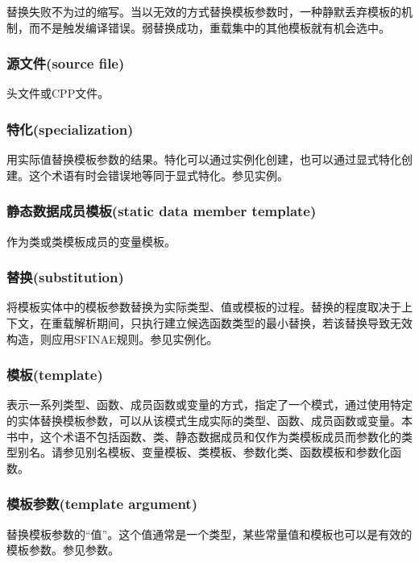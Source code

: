替换失败不为过的缩写。当以无效的方式替换模板参数时，一种静默丢弃模板的机制，而不是触发编译错误。弱替换成功，重载集中的其他模板就有机会选中。

\subsubsection{源文件(source file)}

头文件或CPP文件。

\subsubsection{特化(specialization)}

用实际值替换模板参数的结果。特化可以通过实例化创建，也可以通过显式特化创建。这个术语有时会错误地等同于显式特化。参见实例。

\subsubsection{静态数据成员模板(static data member template)}

作为类或类模板成员的变量模板。

\subsubsection{替换(substitution)}

将模板实体中的模板参数替换为实际类型、值或模板的过程。替换的程度取决于上下文，在重载解析期间，只执行建立候选函数类型的最小替换，若该替换导致无效构造，则应用SFINAE规则。参见实例化。

\subsubsection{模板(template)}

表示一系列类型、函数、成员函数或变量的方式，指定了一个模式，通过使用特定的实体替换模板参数，可以从该模式生成实际的类型、函数、成员函数或变量。本书中，这个术语不包括函数、类、静态数据成员和仅作为类模板成员而参数化的类型别名。请参见别名模板、变量模板、类模板、参数化类、函数模板和参数化函数。

\subsubsection{模板参数(template argument)}

替换模板参数的“值”。这个值通常是一个类型，某些常量值和模板也可以是有效的模板参数。参见参数。

